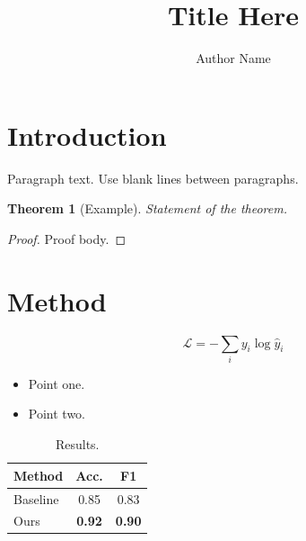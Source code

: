 \documentclass[11pt, a4paper]{article}
\title{Title Here}
\author{Author Name}
\date{}
\theoremstyle{plain}
\newtheorem{theorem}{Theorem}[section]
\theoremstyle{definition}
\begin{document}
\maketitle

\section{Introduction}
Paragraph text. Use blank lines between paragraphs.

\begin{theorem}[Example]
  Statement of the theorem.
\end{theorem}

\begin{proof}
  Proof body.
\end{proof}

\section{Method}

\begin{equation}
  \mathcal{L} = -\sum_i y_i \log \hat{y}_i
\end{equation}

\begin{itemize}[leftmargin=*, itemsep=2pt]
  \item Point one.
  \item Point two.
\end{itemize}

\begin{table}[H]
  \centering
  \caption{Results.}
  \label{tab:results}
  \begin{tabular}{lcc}
    \toprule
    Method & Acc. & F1 \\
    \midrule
    Baseline & 0.85 & 0.83 \\
    Ours     & \textbf{0.92} & \textbf{0.90} \\
    \bottomrule
  \end{tabular}
\end{table}
\end{document}
